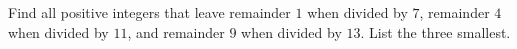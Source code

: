 Find all positive integers that leave remainder $1$ when divided by $7$, remainder $4$ when divided by $11$, and remainder $9$ when divided by $13$. List the three smallest.
